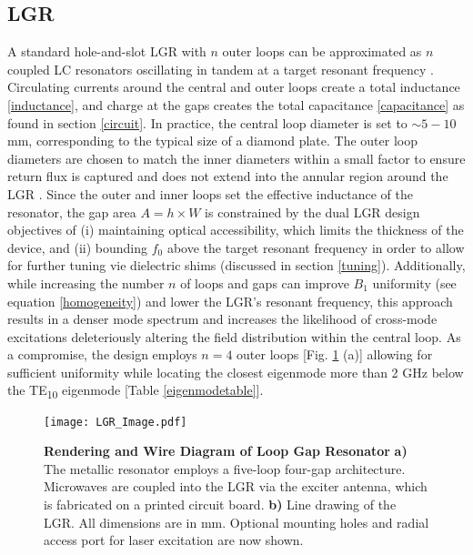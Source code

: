 \subsection{LGR}

A standard hole-and-slot LGR with $n$ outer loops can be approximated as $n$ coupled LC resonators oscillating in tandem at a target resonant frequency \cite{wood1984loop}. Circulating currents around the central and outer loops create a total inductance \ref{inductance}, and charge at the gaps creates the total capacitance \ref{capacitance} as found in section \ref{circuit}. In practice, the central loop diameter is set to $\sim 5-10 $ mm, corresponding to the typical size of a diamond plate. The outer loop diameters are chosen to match the inner diameters within a small factor to ensure return flux is captured and does not extend into the annular region around the LGR \cite{mehdizadeh1983Loop}. Since the outer and inner loops set the effective inductance of the resonator, the gap area $A = h \times W$ is constrained by the dual LGR design objectives of (i) maintaining optical accessibility, which limits the thickness of the device, and (ii) bounding $f_0$ above the target resonant frequency in order to allow for further tuning vie dielectric shims (discussed in section \ref{tuning}). Additionally, while increasing the number $n$ of loops and gaps can improve $B_1$ uniformity (see equation \ref{homogeneity}) and lower the LGR's resonant frequency, this approach results in a denser mode spectrum \cite{froncisz1982loop} and increases the likelihood of cross-mode excitations deleteriously altering the field distribution within the central loop. As a compromise, the design employs $n=4$ outer loops [Fig. \ref{LGR_drawing} (a)] allowing for sufficient uniformity while locating the closest eigenmode more than 2 GHz below the TE\textsubscript{10} eigenmode [Table \ref{eigenmodetable}].  

\begin{figure}[t!]
\centering
\texttt{[image: LGR\_Image.pdf]}  
\caption{\textbf{Rendering and Wire Diagram of Loop Gap Resonator} \textbf{a)} The metallic resonator employs a five-loop four-gap architecture. Microwaves are coupled into the LGR via the exciter antenna, which is fabricated on a printed circuit board. \textbf{b)} Line drawing of the LGR. All dimensions are in mm. Optional mounting holes and radial access port for laser excitation are now shown.}
\label{LGR_drawing}
\end{figure}

